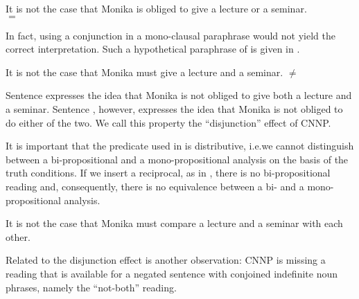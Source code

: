 \documentclass[output=paper]{langsci/langscibook}
\begin{document}
\ea \label{ex-tie-conj-paraOr}
It is not the case that Monika is obliged to give a lecture or a seminar.\\
\hspace*{\fill} $=$  
\z 

In fact, using a conjunction in a mono-clausal paraphrase would not yield the correct interpretation. Such a hypothetical paraphrase of  is given 
in . 

\ea \label{ex-tie-para-dis}
It is not the case that Monika must give a lecture and a seminar.
\hfill $\not=$  
\z 

Sentence  expresses the idea that Monika is not obliged to give both a lecture and a seminar. 
Sentence , however, expresses the idea that Monika is not obliged to do either of the two. 
We call this property the ``disjunction'' effect of CNNP. 

It is important that the predicate used in  is distributive, i.e.\@ we cannot distinguish between a bi-propositional and a mono-propositional analysis on the basis of the truth conditions. If we insert a reciprocal, as in , there is no bi-propositional reading and, consequently, there is 
no equivalence between a bi- and a mono-propositional analysis.

\ea \label{ex-tie-para-reci}
It is not the case that Monika must compare a lecture and a seminar with each other.
\z


Related to the disjunction effect is another observation:
CNNP is missing a reading that is available for a negated sentence with conjoined indefinite noun phrases, namely the ``not-both'' reading.


\end{document}
